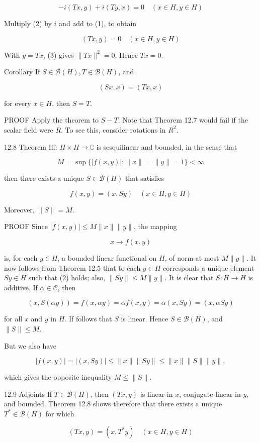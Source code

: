 \documentclass[10pt]{article}
\begin{document}
$$
-i(T x, y)+i(T y, x)=0 \quad(x \in H, y \in H)
$$

Multiply (2) by $i$ and add to (1), to obtain

$$
(T x, y)=0 \quad(x \in H, y \in H)
$$

With $y=T x$, (3) gives $\|T x\|^{2}=0$. Hence $T x=0$.

Corollary If $S \in \mathscr{B}(H), T \in \mathscr{B}(H)$, and

$$
(S x, x)=(T x, x)
$$

for every $x \in H$, then $S=T$.

PROOF Apply the theorem to $S-T$. Note that Theorem 12.7 would fail if the scalar field were $R$. To see this, consider rotations in $R^{2}$.

12.8 Theorem Iff: $H \times H \rightarrow \complement$ is sesquilinear and bounded, in the sense that

$$
M=\sup \{|f(x, y)|:\|x\|=\|y\|=1\}<\infty
$$

then there exists a unique $S \in \mathscr{B}(H)$ that satisfies

$$
f(x, y)=(x, S y) \quad(x \in H, y \in H)
$$

Moreover, $\|S\|=M$.

PROOF Since $|f(x, y)| \leq M\|x\|\|y\|$, the mapping

$$
x \rightarrow f(x, y)
$$

is, for each $y \in H$, a bounded linear functional on $H$, of norm at most $M\|y\|$. It now follows from Theorem 12.5 that to each $y \in H$ corresponds a unique element $S y \in H$ such that (2) holds; also, $\|S y\| \leq M\|y\|$. It is clear that $S: H \rightarrow H$ is additive. If $\alpha \in \mathscr{C}$, then

$$
(x, S(\alpha y))=f(x, \alpha y)=\bar{\alpha} f(x, y)=\bar{\alpha}(x, S y)=(x, \alpha S y)
$$

for all $x$ and $y$ in $H$. If follows that $S$ is linear. Hence $S \in \mathscr{B}(H)$, and $\|S\| \leq M$.

But we also have

$$
|f(x, y)|=|(x, S y)| \leq\|x\|\|S y\| \leq\|x\|\|S\|\|y\|,
$$

which gives the opposite inequality $M \leq\|S\|$.

12.9 Adjoints If $T \in \mathscr{B}(H)$, then $(T x, y)$ is linear in $x$, conjugate-linear in $y$, and bounded. Theorem 12.8 shows therefore that there exists a unique $T^{*} \in \mathscr{B}(H)$ for which

$$
(T x, y)=\left(x, T^{*} y\right) \quad(x \in H, y \in H)
$$
\end{document}
